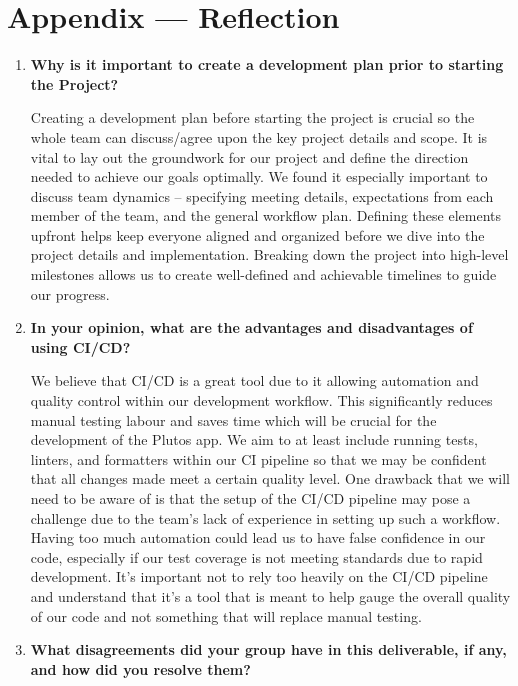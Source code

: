 \documentclass{article}
\begin{document}
\newpage{}

\section{Appendix --- Reflection}

\begin {enumerate}
\item \textbf{Why is it important to create a development plan prior to starting the
Project?}

Creating a development plan before starting the project is crucial so the whole team can discuss/agree upon the key project details and scope. It is vital to lay out the groundwork for our project and define the direction needed to achieve our goals optimally. We found it especially important to discuss team dynamics – specifying meeting details, expectations from each member of the team, and the general workflow plan. Defining these elements upfront helps keep everyone aligned and organized before we dive into the project details and implementation. Breaking down the project into high-level milestones allows us to create well-defined and achievable timelines to guide our progress.

\item \textbf{In your opinion, what are the advantages and disadvantages of using CI/CD?}

We believe that CI/CD is a great tool due to it allowing automation and quality control within our development workflow. This significantly reduces manual testing labour and saves time which will be crucial for the development of the Plutos app. We aim to at least include running tests, linters, and formatters within our CI pipeline so that we may be confident that all changes made meet a certain quality level. One drawback that we will need to be aware of is that the setup of the CI/CD pipeline may pose a challenge due to the team's lack of experience in setting up such a workflow. Having too much automation could lead us to have false confidence in our code, especially if our test coverage is not meeting standards due to rapid development. It's important not to rely too heavily on the CI/CD pipeline and understand that it's a tool that is meant to help gauge the overall quality of our code and not something that will replace manual testing.

\item \textbf{What disagreements did your group have in this deliverable, if any, and how did you resolve them?}


\end{enumerate}
\end{document}
